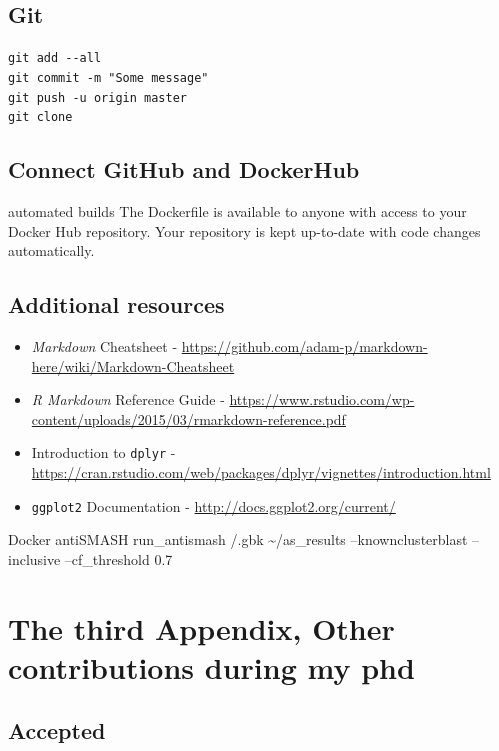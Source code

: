 \documentclass[12pt,twoside]{reedthesis}
\begin{document}
  \section{Git}\label{git}
  
  \texttt{git\ add\ -\/-all}\\
  \texttt{git\ commit\ -m\ "Some\ message"}\\
  \texttt{git\ push\ -u\ origin\ master}\\
  \texttt{git\ clone}
  
  \section{Connect GitHub and
  DockerHub}\label{connect-github-and-dockerhub}
  
  automated builds The Dockerfile is available to anyone with access to
  your Docker Hub repository. Your repository is kept up-to-date with code
  changes automatically.
  
  \section{Additional resources}\label{additional-resources}
  
  \begin{itemize}
  \item
    \emph{Markdown} Cheatsheet -
    \url{https://github.com/adam-p/markdown-here/wiki/Markdown-Cheatsheet}
  \item
    \emph{R Markdown} Reference Guide -
    \url{https://www.rstudio.com/wp-content/uploads/2015/03/rmarkdown-reference.pdf}
  \item
    Introduction to \texttt{dplyr} -
    \url{https://cran.rstudio.com/web/packages/dplyr/vignettes/introduction.html}
  \item
    \texttt{ggplot2} Documentation -
    \url{http://docs.ggplot2.org/current/}
  \end{itemize}
  
  Docker antiSMASH run\_antismash /.gbk \textasciitilde{}/as\_results
  --knownclusterblast --inclusive --cf\_threshold 0.7
  
  \chapter{The third Appendix, Other contributions during my
  phd}\label{the-third-appendix-other-contributions-during-my-phd}
  
  \section{Accepted}\label{accepted}
  
\end{document}
